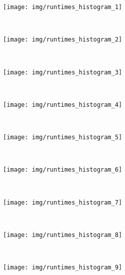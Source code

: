 \begin{subfigure}[h]{.32\textwidth}
  \centering
  \texttt{[image: img/runtimes\_histogram\_1]}
  \vspace{-1.5em} %
  \caption{}
  \label{fig:runtimes-histogram-1}
\end{subfigure}
~%
\begin{subfigure}[h]{.32\textwidth}
  \centering
  \texttt{[image: img/runtimes\_histogram\_2]}
  \vspace{-1.5em} %
  \caption{}
  \label{fig:runtimes-histogram-2}
\end{subfigure}
~%
\begin{subfigure}[h]{.32\textwidth}
  \centering
  \texttt{[image: img/runtimes\_histogram\_3]}
  \vspace{-1.5em} %
  \caption{}
  \label{fig:runtimes-histogram-3}
\end{subfigure}
\\
\begin{subfigure}[h]{.32\textwidth}
  \centering
  \texttt{[image: img/runtimes\_histogram\_4]}
  \vspace{-1.5em} %
  \caption{}
  \label{fig:runtimes-histogram-4}
\end{subfigure}
~%
\begin{subfigure}[h]{.32\textwidth}
  \centering
  \texttt{[image: img/runtimes\_histogram\_5]}
  \vspace{-1.5em} %
  \caption{}
  \label{fig:runtimes-histogram-5}
\end{subfigure}
~%
\begin{subfigure}[h]{.32\textwidth}
  \centering
  \texttt{[image: img/runtimes\_histogram\_6]}
  \vspace{-1.5em} %
  \caption{}
  \label{fig:runtimes-histogram-6}
\end{subfigure}
\\
\begin{subfigure}[h]{.32\textwidth}
  \centering
  \texttt{[image: img/runtimes\_histogram\_7]}
  \vspace{-1.5em} %
  \caption{}
  \label{fig:runtimes-histogram-7}
\end{subfigure}
~%
\begin{subfigure}[h]{.32\textwidth}
  \centering
  \texttt{[image: img/runtimes\_histogram\_8]}
  \vspace{-1.5em} %
  \caption{}
  \label{fig:runtimes-histogram-8}
\end{subfigure}
~%
\begin{subfigure}[h]{.32\textwidth}
  \centering
  \texttt{[image: img/runtimes\_histogram\_9]}
  \vspace{-1.5em} %
  \caption{}
  \label{fig:runtimes-histogram-9}
\end{subfigure}
